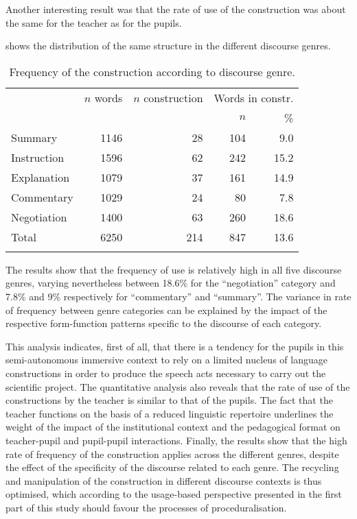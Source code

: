 \documentclass[output=paper]{langscibook}
\begin{document}
Another interesting result was that the rate of use of the construction was about the same for the teacher as for the pupils. 

 shows the distribution of the same structure in the different discourse genres.

\begin{table}
\caption{Frequency of the construction according to discourse genre.\label{tab:14:3}} 
\begin{tabular}{l rrrr} 
\lsptoprule
& {$n$ words} & {$n$ construction}  & \multicolumn{2}{c}{Words in constr.}\\\cmidrule(lr){4-5}
&                   &                             & $n$ & \%\\\midrule
{Summary} & 1146 & 28 & 104 & 9.0\\
{Instruction} & 1596 & 62 & 242 & 15.2\\
{Explanation} & 1079 & 37 & 161 & 14.9\\
{Commentary} & 1029 & 24 & 80 & 7.8\\
{Negotiation} & 1400 & 63 & 260 & 18.6\\\midrule 
{Total} & 6250 & 214 & 847 & 13.6\\
\lspbottomrule
\end{tabular}
\end{table}


The results show that the frequency of use is relatively high in all five discourse genres, varying nevertheless between 18.6\% for the “negotiation” category and 7.8\% and 9\% respectively for “commentary” and “summary”. The variance in rate of frequency between genre categories can be explained by the impact of the respective form-function patterns specific to the discourse of each category. 


This analysis indicates, first of all, that there is a tendency for the pupils in this semi-autonomous immersive context to rely on a limited nucleus of language constructions in order to produce the speech acts necessary to carry out the scientific project. The quantitative analysis also reveals that the rate of use of the constructions by the teacher is similar to that of the pupils. The fact that the teacher functions on the basis of a reduced linguistic repertoire underlines the weight of the impact of the institutional context and the pedagogical format on teacher-pupil and pupil-pupil interactions. Finally, the results show that the high rate of frequency of the construction applies across the different genres, despite the effect of the specificity of the discourse related to each genre. The recycling and manipulation of the construction in different discourse contexts is thus optimised, which according to the usage-based perspective presented in the first part of this study should favour the processes of proceduralisation.
\end{document}
